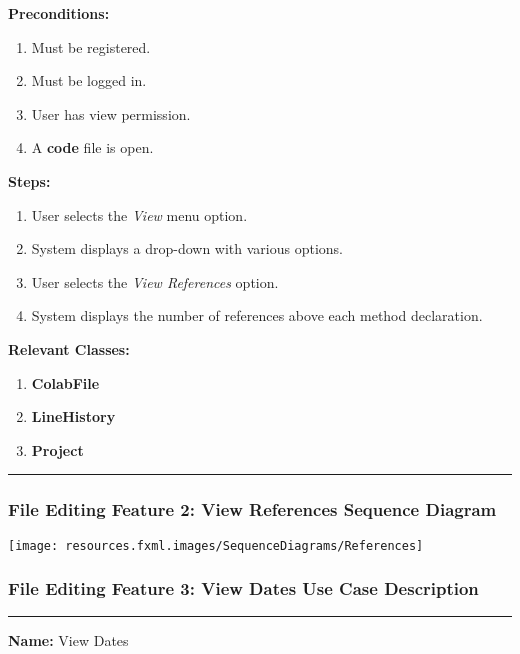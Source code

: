 \documentclass[twoside,letterpaper]{article}
\begin{document}
	\noindent\textbf{Preconditions:}
	\begin{enumerate}
		\item Must be registered.
		\item Must be logged in.
		\item User has view permission.
		\item A \textbf{code} file is open.
	\end{enumerate}
	\noindent\textbf{Steps:}
	\begin{enumerate}
		\item User selects the \textit{View} menu option.
		\item System displays a drop-down with various options.
		\item User selects the \textit{View References} option.
		\item System displays the number of references above each method declaration.
	\end{enumerate}
	\noindent\textbf{Relevant Classes:}
	\begin{enumerate}
		\item \textbf {ColabFile}
		\item \textbf {LineHistory}
		\item \textbf {Project}
	\end{enumerate}
\vspace{8pt}
\hrule
\newpage

\subsubsection[File Editing Feature 2: View References Sequence Diagram]{\rmfamily\bfseries\color{black}
	File Editing Feature 2: View References Sequence Diagram}
\hypertarget{RefHeading22059017292}{}

\bigskip

\texttt{[image: resources.fxml.images/SequenceDiagrams/References]}

\newpage

\subsubsection[File Editing Feature 3: View Dates]{\rmfamily\bfseries\color{black}
	File Editing Feature 3: View Dates Use Case Description}
\hypertarget{RefHeading22059017292}{}

\vspace{2pt}
\hrule
\vspace{8pt}
	\noindent\textbf{Name:} View Dates \newline
	
\end{document}
